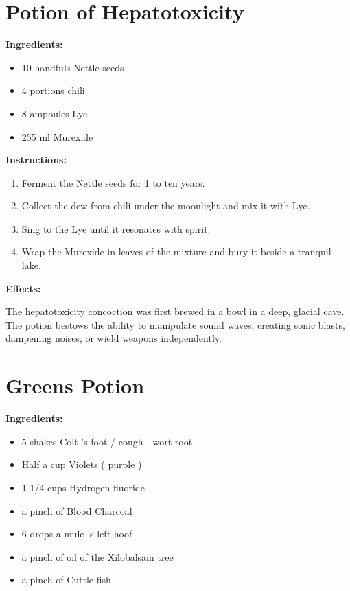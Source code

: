\documentclass{article}
\begin{document}
\newpage
\section*{Potion of Hepatotoxicity}

\textbf{Ingredients:}

\begin{itemize}
  \item 10 handfuls Nettle seeds
  \item 4 portions chili
  \item 8 ampoules Lye
  \item 255 ml Murexide
\end{itemize}

\textbf{Instructions:}

\begin{enumerate}
  \item Ferment the Nettle seeds for 1 to ten years.
  \item Collect the dew from chili under the moonlight and mix it with Lye.
  \item Sing to the Lye until it resonates with spirit.
  \item Wrap the Murexide in leaves of the mixture and bury it beside a tranquil lake.
\end{enumerate}

\textbf{Effects:}

The hepatotoxicity concoction was first brewed in a bowl in a deep, glacial cave. The potion bestows the ability to manipulate sound waves, creating sonic blasts, dampening noises, or wield weapons independently.

\newpage
\section*{Greens Potion}

\textbf{Ingredients:}

\begin{itemize}
  \item 5 shakes Colt 's foot / cough - wort root
  \item Half a cup Violets ( purple )
  \item 1 1/4 cups Hydrogen fluoride
  \item a pinch of Blood Charcoal
  \item 6 drops a mule 's left hoof
  \item a pinch of oil of the Xilobalsam tree
  \item a pinch of Cuttle fish
\end{itemize}
\end{document}

